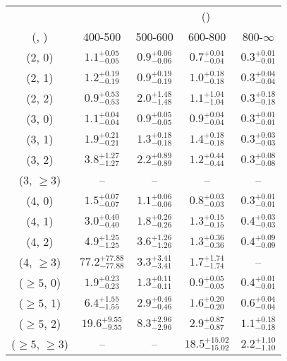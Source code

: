 \begin{table}[h!]
\tiny
\centering
{}
\begin{tabular}
{ccccc}
	\hline\hline
&	& \multicolumn{4}{c}{\scalht (\gev)} \\ 
	 (\njet,  \nb) & 400-500 & 500-600 & 600-800 & 800-$\infty$ \\ [0.8ex] 
\hline
	(2, 0) & $1.1^{+ 0.05 }_{- 0.05 }$ & $0.9^{+ 0.06 }_{- 0.06 }$ & $0.7^{+ 0.04 }_{- 0.04 }$ & $0.3^{+ 0.01 }_{- 0.01 }$ \\[0.5ex] 
	(2, 1) & $1.2^{+ 0.19 }_{- 0.19 }$ & $0.9^{+ 0.19 }_{- 0.19 }$ & $1.0^{+ 0.18 }_{- 0.18 }$ & $0.3^{+ 0.04 }_{- 0.04 }$ \\[0.5ex] 
	(2, 2) & $0.9^{+ 0.53 }_{- 0.53 }$ & $2.0^{+ 1.48 }_{- 1.48 }$ & $1.1^{+ 1.04 }_{- 1.04 }$ & $0.3^{+ 0.18 }_{- 0.18 }$ \\[0.5ex] 
	(3, 0) & $1.1^{+ 0.04 }_{- 0.04 }$ & $0.9^{+ 0.05 }_{- 0.05 }$ & $0.9^{+ 0.04 }_{- 0.04 }$ & $0.3^{+ 0.01 }_{- 0.01 }$ \\[0.5ex] 
	(3, 1) & $1.9^{+ 0.21 }_{- 0.21 }$ & $1.3^{+ 0.18 }_{- 0.18 }$ & $1.4^{+ 0.18 }_{- 0.18 }$ & $0.3^{+ 0.03 }_{- 0.03 }$ \\[0.5ex] 
	(3, 2) & $3.8^{+ 1.27 }_{- 1.27 }$ & $2.2^{+ 0.89 }_{- 0.89 }$ & $1.2^{+ 0.44 }_{- 0.44 }$ & $0.3^{+ 0.08 }_{- 0.08 }$ \\[0.5ex] 
	(3, $\ge3$) & -- & -- & -- & -- \\[0.5ex] 
	(4, 0) & $1.5^{+ 0.07 }_{- 0.07 }$ & $1.1^{+ 0.06 }_{- 0.06 }$ & $0.8^{+ 0.03 }_{- 0.03 }$ & $0.3^{+ 0.01 }_{- 0.01 }$ \\[0.5ex] 
	(4, 1) & $3.0^{+ 0.40 }_{- 0.40 }$ & $1.8^{+ 0.26 }_{- 0.26 }$ & $1.3^{+ 0.15 }_{- 0.15 }$ & $0.4^{+ 0.03 }_{- 0.03 }$ \\[0.5ex] 
	(4, 2) & $4.9^{+ 1.25 }_{- 1.25 }$ & $3.6^{+ 1.26 }_{- 1.26 }$ & $1.3^{+ 0.36 }_{- 0.36 }$ & $0.4^{+ 0.09 }_{- 0.09 }$ \\[0.5ex] 
	(4, $\ge3$) & $77.2^{+ 77.88 }_{- 77.88 }$ & $3.3^{+ 3.41 }_{- 3.41 }$ & $1.7^{+ 1.74 }_{- 1.74 }$ & -- \\[0.5ex] 
	($\ge5$, 0) & $1.9^{+ 0.23 }_{- 0.23 }$ & $1.3^{+ 0.11 }_{- 0.11 }$ & $0.9^{+ 0.05 }_{- 0.05 }$ & $0.4^{+ 0.01 }_{- 0.01 }$ \\[0.5ex] 
	($\ge5$, 1) & $6.4^{+ 1.55 }_{- 1.55 }$ & $2.9^{+ 0.46 }_{- 0.46 }$ & $1.6^{+ 0.20 }_{- 0.20 }$ & $0.6^{+ 0.04 }_{- 0.04 }$ \\[0.5ex] 
	($\ge5$, 2) & $19.6^{+ 9.55 }_{- 9.55 }$ & $8.3^{+ 2.96 }_{- 2.96 }$ & $2.9^{+ 0.87 }_{- 0.87 }$ & $1.1^{+ 0.18 }_{- 0.18 }$ \\[0.5ex] 
	($\ge5$, $\ge3$) & -- & -- & $18.5^{+ 15.02 }_{- 15.02 }$ & $2.2^{+ 1.10 }_{- 1.10 }$ \\[0.5ex] 
	\hline
	\hline
\end{tabular}
\end{table}
